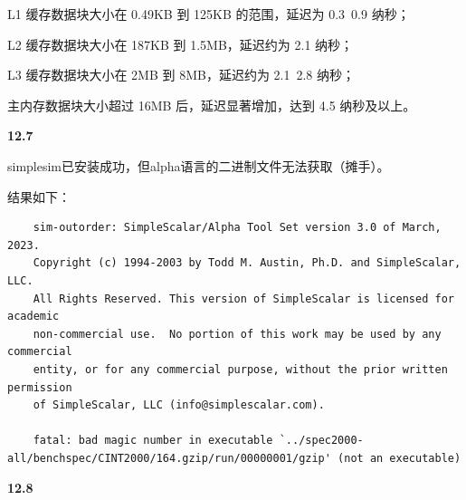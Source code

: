 \documentclass[UTF8]{report}
\begin{document}
L1 缓存数据块大小在 0.49KB 到 125KB 的范围，延迟为 0.3~0.9 纳秒；

L2 缓存数据块大小在 187KB 到 1.5MB，延迟约为 2.1 纳秒；

L3 缓存数据块大小在 2MB 到 8MB，延迟约为 2.1~2.8 纳秒；

主内存数据块大小超过 16MB 后，延迟显著增加，达到 4.5 纳秒及以上。

\noindent
\textbf{12.7}

simplesim已安装成功，但alpha语言的二进制文件无法获取（摊手）。

结果如下：

\begin{lstlisting}
    sim-outorder: SimpleScalar/Alpha Tool Set version 3.0 of March, 2023.
    Copyright (c) 1994-2003 by Todd M. Austin, Ph.D. and SimpleScalar, LLC.
    All Rights Reserved. This version of SimpleScalar is licensed for academic
    non-commercial use.  No portion of this work may be used by any commercial
    entity, or for any commercial purpose, without the prior written permission
    of SimpleScalar, LLC (info@simplescalar.com).
    
    fatal: bad magic number in executable `../spec2000-all/benchspec/CINT2000/164.gzip/run/00000001/gzip' (not an executable)    
\end{lstlisting}

\noindent
\textbf{12.8}
\end{document}
